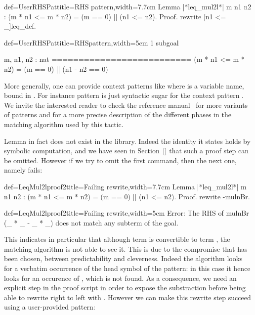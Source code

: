 \begin{coq}{def=UserRHSPat}{title=RHS pattern,width=7.7cm}
Lemma |*leq_mul2l*| m n1 n2 :
(m * n1 <= m * n2) = (m == 0) || (n1 <= n2).
Proof.
rewrite [n1 <= _]leq_def.
\end{coq}
\begin{coqout}{def=UserRHSPat}{title=RHSpattern,width=5cm}
1 subgoal

m, n1, n2 : nat
==========================
(m * n1 <= m * n2) =
(m == 0) || (n1 - n2 == 0)
\end{coqout}

More generally, one can provide context patterns like \C{[in X in T]}
where  is a variable name, bound in . For instance pattern
\C{[in RHS]} is just syntactic sugar for the context pattern
\C{[in X in _ = X]}.  We invite the interested reader to check the
reference manual~\cite{ssrman} for more variants of patterns and for a
more precise description of the different phases in the matching
algorithm used by this tactic.

Lemma  in fact does not exist in the library. Indeed the
identity it states holds by symbolic computation, and we have seen in
Section~\ref{} that such a proof step can be omitted. However if we
try to omit the first  command, then the next one,
namely  fails:

\begin{coq}{def=LeqMul2lproof2}{title=Failing rewrite,width=7.7cm}
Lemma |*leq_mul2l*| m n1 n2 :
(m * n1 <= m * n2) = (m == 0) || (n1 <= n2).
Proof.
rewrite -mulnBr.
\end{coq}
\begin{coqout}{def=LeqMul2lproof2}{title=Failing rewrite,width=5cm}
Error: The RHS of mulnBr (_ * _ - _ * _) does not match any subterm of
the goal.
\end{coqout}

This indicates in particular that although term 
is convertible to term , the matching
algorithm is not able to see it. This is due to the compromise that
has been chosen, between predictability and cleverness. Indeed the
algorithm looks for a verbatim occurrence of the head symbol of the
pattern: in this case it hence looks for an occurence of \C{_ - _},
which is not found. As a consequence, we need an explicit step in the
proof script in order to expose the substraction before being able to
rewrite right to left with . However we can make this
rewrite step succeed using a user-provided pattern:

